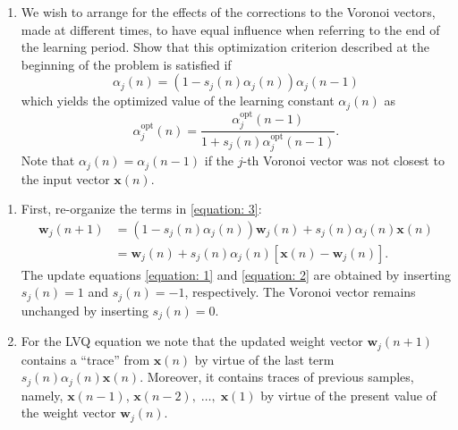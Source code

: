 \begin{enumerate}
\begin{enumerate}
  \item We wish to arrange for the effects of the corrections to the
    Voronoi vectors, made at different times, to have equal influence
    when referring to the end of the learning period.  Show that this
    optimization criterion described at the beginning of the problem
    is satisfied if
    \begin{equation*}
      \alpha_j(n)=(1-s_j(n)\alpha_j(n))\alpha_j(n-1)
    \end{equation*}
    which yields the optimized value of the learning constant
    $\alpha_j(n)$ as
    \begin{equation*}
      \alpha_j^{\text{opt}}(n) = \frac {\alpha_j^{\text{opt}}(n-1)} {1
        + s_j(n) \alpha_j^{\text{opt}}(n-1)}.
    \end{equation*}
    Note that $\alpha_j(n)=\alpha_j(n-1)$ if the $j$-th Voronoi vector
    was not closest to the input vector $\mathbf{x}(n)$.
  \end{enumerate}

  \begin{solution}

    \begin{enumerate}
    \item 

      First, re-organize the terms in \eqref{equation: 3}:
      \begin{align*}
        \mathbf{w}_j(n+1) &= (1-s_j(n)\alpha_j(n)) \mathbf{w}_j(n) +
        s_j(n)\alpha_j(n)\mathbf{x}(n)
        \\
        &= \mathbf{w}_j(n) + s_j(n) \alpha_j(n) [\mathbf{x}(n) -
        \mathbf{w}_j(n)].
      \end{align*}
      The update equations \eqref{equation: 1} and \eqref{equation: 2}
      are obtained by inserting $s_j(n)=1$ and $s_j(n)=-1$,
      respectively.  The Voronoi vector remains unchanged by inserting
      $s_j(n)=0$.

    \item 

      For the LVQ equation we note that the updated weight vector
      $\mathbf{w}_j(n+1)$ contains a ``trace'' from $\mathbf{x}(n)$ by
      virtue of the last term $s_j(n)\alpha_j(n)\mathbf{x}(n)$.
      Moreover, it contains traces of previous samples, namely,
      $\mathbf{x}(n-1)$, $\mathbf{x}(n-2),\;\ldots,\; \mathbf{x}(1)$
      by virtue of the present value of the weight vector
      $\mathbf{w}_j(n)$.


\end{enumerate}
\end{solution}
\end{enumerate}
